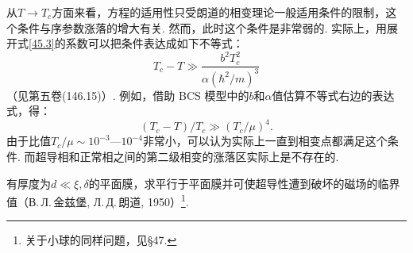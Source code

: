 从$T\to T_c$方面来看，方程的适用性只受朗道的相变理论一般适用条件的限制，这个条件与序参数涨落的增大有关. 然而，此时这个条件是非常弱的. 实际上，用展开式\eqref{45.3}的系数可以把条件表达成如下不等式：
\begin{equation*}
T_c - T \gg \frac{b^2T_c^2}{\alpha(\hbar^2/m)^3}
\end{equation*}
（见第五卷(146.15)）. 例如，借助 BCS 模型中的$b$和$\alpha$值估算不等式右边的表达式，得：
\begin{equation}
(T_c-T)/T_c \gg (T_c/\mu)^4.
\label{45.21}
\end{equation}
由于比值$T_c/\mu\sim10^{-3}$—$10^{-4}$非常小，可以认为实际上一直到相变点都满足这个条件. 而超导相和正常相之间的第二级相变的涨落区实际上是不存在的.

\begin{xiti}

有厚度为$d\ll\xi,\delta$的平面膜，求平行于平面膜并可使超导性遭到破坏的磁场的临界值（В.\,Л.\,金兹堡, Л.\,Д.\,朗道, 1950）\footnote{关于小球的同样问题，见§47.}.


\end{xiti}
